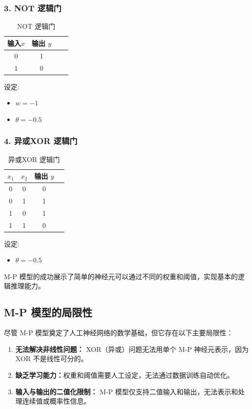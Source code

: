 \subsubsection*{\bf 3.  NOT 逻辑门}

\begin{table}[htbp]
\centering
\caption{NOT 逻辑门}
\begin{tabular}{|c|c|c|c|}
\hline
{\bf 输入$x$}  & 输出 $y$ \\
\hline
0  & 1   \\
\hline
1  & 0    \\
\hline
\end{tabular}
\label{NOT 逻辑门}
\end{table}

设定:
\begin{itemize}
\item $w =-1 $
\item $\theta =-0.5$ 
\end{itemize}

\subsubsection*{\bf 4.  异或XOR 逻辑门}

\begin{table}[htbp]
\centering
\caption{异或XOR 逻辑门}
\begin{tabular}{|c|c|c|c|}
\hline
{\bf $x_1$} & $x_2$ & 输出 $y$ \\
\hline
0  & 0  & 0    \\
\hline
0  & 1  & 1   \\
\hline
1  & 0  & 1    \\
\hline
1  & 1  & 0   \\
\hline
\end{tabular}
\label{XOR逻辑门}
\end{table}

设定:
\begin{itemize}
\item $\theta =-0.5$ 
\end{itemize}

M-P 模型的成功展示了简单的神经元可以通过不同的权重和阈值，实现基本的逻辑推理能力。

\subsection{M-P 模型的局限性}
尽管 M-P 模型奠定了人工神经网络的数学基础，但它存在以下主要局限性：
\begin{enumerate}
\item {\bf 无法解决非线性问题：} XOR（异或）问题无法用单个 M-P 神经元表示，因为 XOR 不是线性可分的。

\item {\bf 缺乏学习能力：}权重和阈值需要人工设定，无法通过数据训练自动优化。

\item {\bf 输入与输出的二值化限制：} M-P 模型仅支持二值输入和输出，无法表示和处理连续值或概率性信息。
\end{enumerate}

